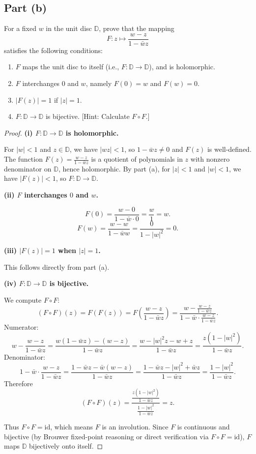\documentclass{article}
\begin{document}
\subsection*{Part (b)}

For a fixed $w$ in the unit disc $\mathbb{D}$, prove that the mapping
\[
  F : z \mapsto \frac{w - z}{1 - \bar wz}
\]
satisfies the following conditions:

\begin{enumerate}
  \item[(i)] $F$ maps the unit disc to itself (i.e., $F : \mathbb{D}
    \to \mathbb{D}$),
    and is holomorphic.
  \item[(ii)] $F$ interchanges $0$ and $w$, namely $F(0) = w$ and $F(w) = 0$.
  \item[(iii)] $|F(z)| = 1$ if $|z| = 1$.
  \item[(iv)] $F : \mathbb{D} \to \mathbb{D}$ is bijective. [Hint:
    Calculate $F \circ F$.]
\end{enumerate}

\begin{proof}
  \textbf{(i) $F: \mathbb{D} \to \mathbb{D}$ is holomorphic.}

  For $|w| < 1$ and $z \in \mathbb{D}$, we have $|wz| < 1$, so $1 -
  \bar wz \ne 0$
  and $F(z)$ is well-defined. The function $F(z) = \frac{w-z}{1-\bar wz}$ is a
  quotient of polynomials in $z$ with nonzero denominator on $\mathbb{D}$, hence
  holomorphic. By part (a), for $|z| < 1$ and $|w| < 1$, we have
  $|F(z)| < 1$, so $F : \mathbb{D} \to \mathbb{D}$.

  \textbf{(ii) $F$ interchanges $0$ and $w$.}

  \[
    F(0) = \frac{w - 0}{1 - \bar w \cdot 0} = \frac{w}{1} = w.
  \]
  \[
    F(w) = \frac{w - w}{1 - \bar ww} = \frac{0}{1 - |w|^2} = 0.
  \]

  \textbf{(iii) $|F(z)| = 1$ when $|z| = 1$.}

  This follows directly from part (a).

  \textbf{(iv) $F : \mathbb{D} \to \mathbb{D}$ is bijective.}

  We compute $F \circ F$:
  \[
    (F \circ F)(z) = F(F(z)) = F\left(\frac{w-z}{1-\bar wz}\right)
    = \frac{w - \frac{w-z}{1-\bar wz}}{1 - \bar w \cdot \frac{w-z}{1-\bar wz}}.
  \]
  Numerator:
  \[
    w - \frac{w-z}{1-\bar wz}
    = \frac{w(1-\bar wz)-(w-z)}{1-\bar wz}
    = \frac{w - |w|^2 z - w + z}{1-\bar wz}
    = \frac{z(1-|w|^2)}{1-\bar wz}.
  \]
  Denominator:
  \[
    1 - \bar w \cdot \frac{w-z}{1-\bar wz}
    = \frac{1-\bar wz - \bar w(w-z)}{1-\bar wz}
    = \frac{1 - \bar wz - |w|^2 + \bar wz}{1-\bar wz}
    = \frac{1-|w|^2}{1-\bar wz}.
  \]
  Therefore
  \[
    (F \circ F)(z) = \frac{\frac{z(1-|w|^2)}{1-\bar
    wz}}{\frac{1-|w|^2}{1-\bar wz}} = z.
  \]

  Thus $F \circ F = \text{id}$, which means $F$ is an involution. Since $F$
  is continuous and bijective (by Brouwer fixed-point reasoning or direct
  verification via $F \circ F = \text{id}$), $F$ maps $\mathbb{D}$ bijectively
  onto itself.
\end{proof}
\end{document}
